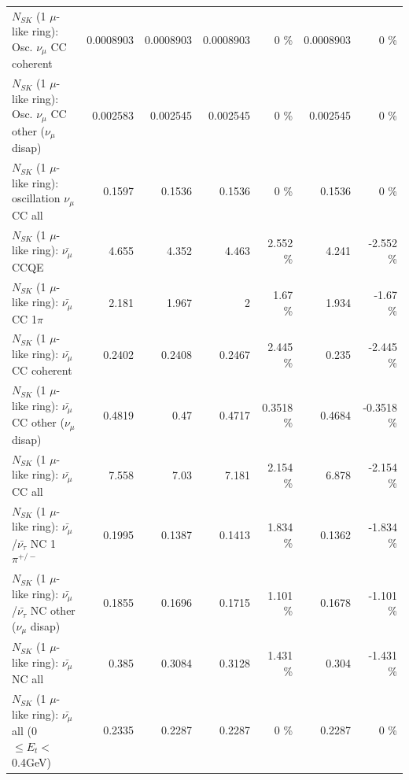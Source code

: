 \begin{table}
\begin{tabular}{| l | r | r | r  r | r  r |}
                        $N_{SK}$ (1 $\mu$-like ring): Osc. $\nu_\mu$ CC coherent &       0.0008903 &       0.0008903 &       0.0008903 &        0 \%  &       0.0008903 &        0 \%  \\ 
         $N_{SK}$ (1 $\mu$-like ring): Osc. $\nu_\mu$ CC other ($\nu_\mu$ disap) &        0.002583 &        0.002545 &        0.002545 &        0 \%  &        0.002545 &        0 \%  \\ 
                      $N_{SK}$ (1 $\mu$-like ring): oscillation $\nu_\mu$ CC all &          0.1597 &          0.1536 &          0.1536 &        0 \%  &          0.1536 &        0 \%  \\ 
\hline
\hline
                              $N_{SK}$ (1 $\mu$-like ring): $\bar{\nu_\mu}$ CCQE &           4.655 &           4.352 &           4.463 &    2.552 \%  &           4.241 &   -2.552 \%  \\ 
                         $N_{SK}$ (1 $\mu$-like ring): $\bar{\nu_\mu}$ CC 1$\pi$ &           2.181 &           1.967 &               2 &     1.67 \%  &           1.934 &    -1.67 \%  \\ 
                       $N_{SK}$ (1 $\mu$-like ring): $\bar{\nu_\mu}$ CC coherent &          0.2402 &          0.2408 &          0.2467 &    2.445 \%  &           0.235 &   -2.445 \%  \\ 
        $N_{SK}$ (1 $\mu$-like ring): $\bar{\nu_\mu}$ CC other ($\nu_\mu$ disap) &          0.4819 &            0.47 &          0.4717 &   0.3518 \%  &          0.4684 &  -0.3518 \%  \\ 
                          $N_{SK}$ (1 $\mu$-like ring): $\bar{\nu_{\mu}}$ CC all &           7.558 &            7.03 &           7.181 &    2.154 \%  &           6.878 &   -2.154 \%  \\ 
\hline
  $N_{SK}$ (1 $\mu$-like ring): $\bar{\nu_\mu}$/$\bar{\nu_\tau}$ NC 1$\pi^{+/-}$ &          0.1995 &          0.1387 &          0.1413 &    1.834 \%  &          0.1362 &   -1.834 \%  \\ 
$N_{SK}$ (1 $\mu$-like ring): $\bar{\nu_\mu}$/$\bar{\nu_\tau}$ NC other ($\nu_\mu$ disap) &          0.1855 &          0.1696 &          0.1715 &    1.101 \%  &          0.1678 &   -1.101 \%  \\ 
                          $N_{SK}$ (1 $\mu$-like ring): $\bar{\nu_{\mu}}$ NC all &           0.385 &          0.3084 &          0.3128 &    1.431 \%  &           0.304 &   -1.431 \%  \\ 
\hline
   $N_{SK}$ (1 $\mu$-like ring): $\bar{\nu_{\mu}}$ all (0 $\leq E_{t} <$ 0.4GeV) &          0.2335 &          0.2287 &          0.2287 &        0 \%  &          0.2287 &        0 \%  \\ 

\end{tabular}
\end{table}
